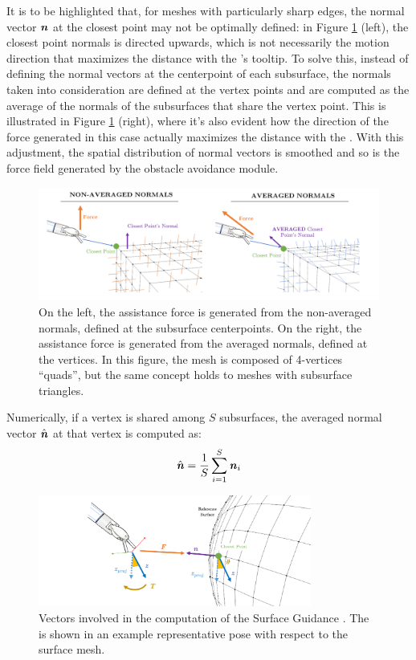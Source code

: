 \documentclass[../main.tex]{subfiles}
\begin{document}
It is to be highlighted that, for meshes with particularly sharp edges, the normal vector $\textbf{\textit{n}}$ at the closest point may not be optimally defined: in Figure \ref{fig:normalsaveraging} (left), the closest point normals is directed upwards, which is not necessarily the motion direction that maximizes the distance with the \psm's tooltip. To solve this, instead of defining the normal vectors at the centerpoint of each subsurface, the normals taken into consideration are defined at the vertex points and are computed as the average of the normals of the subsurfaces that share the vertex point. This is illustrated in Figure \ref{fig:normalsaveraging} (right), where it's also evident how the direction of the force generated in this case actually maximizes the distance with the \ee. With this adjustment, the spatial distribution of normal vectors is smoothed and so is the force field generated by the obstacle avoidance module.
\begin{figure}
    \centering
    \includegraphics[width=\textwidth]{images/normals_averaging.png}
    \caption{On the left, the assistance force is generated from the non-averaged normals, defined at the subsurface centerpoints. On the right, the assistance force is generated from the averaged normals, defined at the vertices. In this figure, the mesh is composed of 4-vertices ``quads'', but the same concept holds to meshes with subsurface triangles.}
    \label{fig:normalsaveraging}
\end{figure}
Numerically, if a vertex is shared among $S$ subsurfaces, the averaged normal vector $\hat{\textbf{\textit{n}}}$ at that vertex is computed as:
\begin{equation}
    \hat{\textbf{\textit{n}}} = \frac{1}{S}\sum_{i=1}^{S} \textbf{\textit{n}}_i
    \label{eq:normalsaveraging}
\end{equation}

\begin{figure}
    \centering
    \includegraphics[width=0.8\textwidth]{images/surface_guidance.png}
    \caption{Vectors involved in the computation of the Surface Guidance \vf. The \psm is shown in an example representative pose with respect to the surface mesh.}
    \label{fig:surfaceguidance}
\end{figure}
\end{document}
